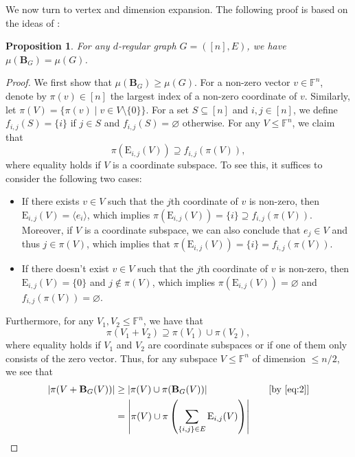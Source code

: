 \documentclass[11pt]{article}
\newtheorem{proposition}[theorem]{Proposition}
\theoremstyle{plain}
\numberwithin{equation}{section}
\theoremstyle{definition}
\newcommand{\F}{\mathbb{F}}
\newcommand{\tuple}[1]{\mathbf{#1}}
\newcommand{\vB}{\tuple{B}}
\newcommand{\E}{\mathrm{E}}
\begin{document}
We now turn to vertex and dimension expansion.
The following proof is based on the ideas of \cite{DS09, DW10}:
\begin{proposition}\label{prop:graphical-vertex}
    For any $d$-regular graph $G=([n],E)$, we have $\mu(\vB_G)=\mu(G)$.
\end{proposition}
\begin{proof}
	We first show that $\mu(\vB_G)\geq \mu(G)$. 
    For a non-zero vector $v \in \mathbb{F}^n$, denote by $\pi(v) \in[n]$ the largest index of a non-zero coordinate of $v$. Similarly, let $\pi(V)=\{\pi(v) \mid v \in V \setminus \{0\}\}$. For a set $S\subseteq[n]$ and $i,j\in[n]$, we define $f_{i,j}(S)=\{i\}$ if $j\in S$ and $f_{i,j}(S)=\varnothing$ otherwise. For any $V\leq\F^{n}$, we claim that
    \begin{equation}\label{eq:1}
        \pi(\E_{i,j}(V))\supseteq f_{i,j}(\pi(V)),
    \end{equation}
    where equality holds if $V$ is a coordinate subspace. To see this, it suffices to consider the following two cases:
    \begin{itemize}
        \item If there exists $v\in V$ such that the $j$th coordinate of $v$ is non-zero, then $\E_{i,j}(V)=\langle e_i\rangle$, which implies $\pi(\E_{i,j}(V))=\{i\}\supseteq f_{i,j}(\pi(V))$. Moreover, if $V$ is a coordinate subspace, we can also conclude that $e_j\in V$ and thus $j\in \pi(V)$, which implies that $\pi(\E_{i,j}(V))=\{i\}= f_{i,j}(\pi(V))$.
        \item If there doesn't exist $v\in V$ such that the $j$th coordinate of $v$ is non-zero, then $\E_{i,j}(V)=\{0\}$ and $j\notin\pi(V)$, which implies $\pi(\E_{i,j}(V))=\varnothing$ and $f_{i,j}(\pi(V))=\varnothing$.
    \end{itemize}
    Furthermore, for any $V_1,V_2\leq \F^n$, we have that
    \begin{equation}\label{eq:2}
        \pi(V_1+ V_2)\supseteq\pi(V_1)\cup\pi(V_2),
    \end{equation}
    where equality holds if $V_1$ and $V_2$ are coordinate subspaces or if one of them only consists of the zero vector. Thus, for any subspace $V\leq\F^n$ of dimension $\leq n/2$, we see that
    \begin{align*}
        |\pi(V+\vB_G(V))|&\geq|\pi(V)\cup\pi(\vB_G(V))|\quad &[\text{by \eqref{eq:2}}]\\
        &=\left|\pi(V)\cup\pi\left(\sum_{\{i,j\}\in E}\E_{i,j}(V)\right)\right|\quad &\\

\end{align*}
\end{proof}
\end{document}
